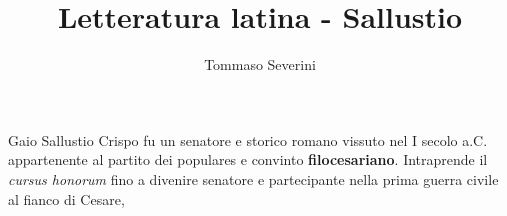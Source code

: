 \documentclass[10pt,a4paper]{article}
\author{Tommaso Severini}
\title{Letteratura latina - Sallustio}
\begin{document}
	\maketitle
	
	Gaio Sallustio Crispo fu un senatore e storico romano vissuto nel I secolo a.C. appartenente al partito dei populares e convinto \textbf{filocesariano}. Intraprende il \textit{cursus honorum} fino a divenire senatore e partecipante nella prima guerra civile al fianco di Cesare,
\end{document}
